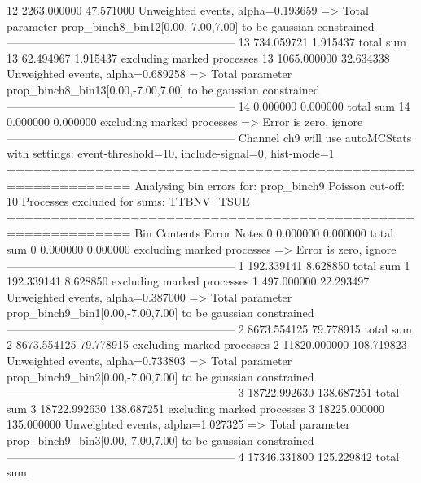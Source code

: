 12         2263.000000     47.571000       Unweighted events, alpha=0.193659
  => Total parameter prop_binch8_bin12[0.00,-7.00,7.00] to be gaussian constrained
------------------------------------------------------------
13         734.059721      1.915437        total sum                     
13         62.494967       1.915437        excluding marked processes    
13         1065.000000     32.634338       Unweighted events, alpha=0.689258
  => Total parameter prop_binch8_bin13[0.00,-7.00,7.00] to be gaussian constrained
------------------------------------------------------------
14         0.000000        0.000000        total sum                     
14         0.000000        0.000000        excluding marked processes    
  => Error is zero, ignore      
------------------------------------------------------------
Channel ch9 will use autoMCStats with settings: event-threshold=10, include-signal=0, hist-mode=1
============================================================
Analysing bin errors for: prop_binch9
Poisson cut-off: 10
Processes excluded for sums: TTBNV_TSUE
============================================================
Bin        Contents        Error           Notes                         
0          0.000000        0.000000        total sum                     
0          0.000000        0.000000        excluding marked processes    
  => Error is zero, ignore      
------------------------------------------------------------
1          192.339141      8.628850        total sum                     
1          192.339141      8.628850        excluding marked processes    
1          497.000000      22.293497       Unweighted events, alpha=0.387000
  => Total parameter prop_binch9_bin1[0.00,-7.00,7.00] to be gaussian constrained
------------------------------------------------------------
2          8673.554125     79.778915       total sum                     
2          8673.554125     79.778915       excluding marked processes    
2          11820.000000    108.719823      Unweighted events, alpha=0.733803
  => Total parameter prop_binch9_bin2[0.00,-7.00,7.00] to be gaussian constrained
------------------------------------------------------------
3          18722.992630    138.687251      total sum                     
3          18722.992630    138.687251      excluding marked processes    
3          18225.000000    135.000000      Unweighted events, alpha=1.027325
  => Total parameter prop_binch9_bin3[0.00,-7.00,7.00] to be gaussian constrained
------------------------------------------------------------
4          17346.331800    125.229842      total sum                     
